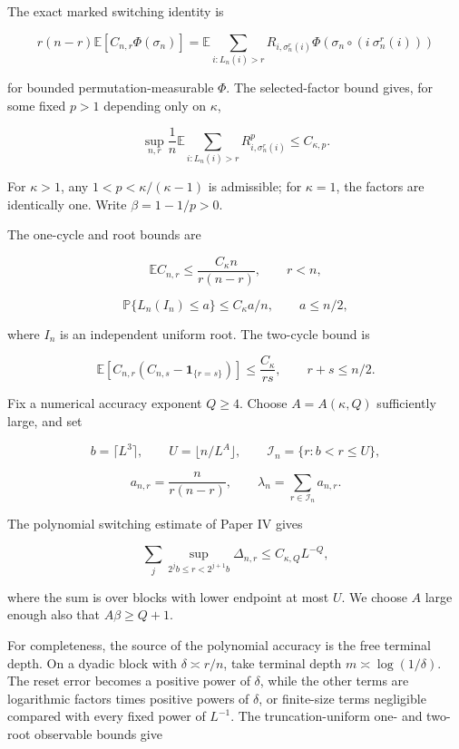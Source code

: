 \documentclass[
  11pt,
]{article}
\begin{document}
The exact marked switching identity is

\[
 r(n-r)\mathbb E[C_{n,r}\Phi(\sigma_n)]
 =\mathbb E\sum_{i:L_n(i)>r}R_{i,\sigma_n^r(i)}
 \Phi\!\left(\sigma_n\circ(i\ \sigma_n^r(i))\right)
\tag{6}
\]

for bounded permutation-measurable \(\Phi\). The selected-factor bound
gives, for some fixed \(p>1\) depending only on \(\kappa\),

\[
 \sup_{n,r}\frac1n\mathbb E\sum_{i:L_n(i)>r}
 R_{i,\sigma_n^r(i)}^p\le C_{\kappa,p}.
\tag{7}
\]

For \(\kappa>1\), any \(1<p<\kappa/(\kappa-1)\) is admissible; for
\(\kappa=1\), the factors are identically one. Write \(\beta=1-1/p>0\).

The one-cycle and root bounds are

\[
 \mathbb EC_{n,r}\le\frac{C_\kappa n}{r(n-r)},\qquad r<n,
\tag{8}
\]

\[
 \mathbb P\{L_n(I_n)\le a\}\le C_\kappa a/n,
 \qquad a\le n/2,
\tag{9}
\]

where \(I_n\) is an independent uniform root. The two-cycle bound is

\[
 \mathbb E[C_{n,r}(C_{n,s}-\mathbf1_{\{r=s\}})]
 \le\frac{C_\kappa}{rs},\qquad r+s\le n/2.
\tag{10}
\]

Fix a numerical accuracy exponent \(Q\ge4\). Choose \(A=A(\kappa,Q)\)
sufficiently large, and set

\[
 b=\lceil L^3\rceil,\qquad U=\lfloor n/L^A\rfloor,
 \qquad \mathcal I_n=\{r:b<r\le U\},
\tag{11}
\]

\[
 a_{n,r}=\frac{n}{r(n-r)},\qquad
 \lambda_n=\sum_{r\in\mathcal I_n}a_{n,r}.
\tag{12}
\]

The polynomial switching estimate of Paper IV gives

\[
 \sum_j\sup_{2^jb\le r<2^{j+1}b}\Delta_{n,r}
 \le C_{\kappa,Q}L^{-Q},
\tag{13}
\]

where the sum is over blocks with lower endpoint at most \(U\). We
choose \(A\) large enough also that \(A\beta\ge Q+1\).

For completeness, the source of the polynomial accuracy is the free
terminal depth. On a dyadic block with \(\delta\asymp r/n\), take
terminal depth \(m\asymp\log(1/\delta)\). The reset error becomes a
positive power of \(\delta\), while the other terms are logarithmic
factors times positive powers of \(\delta\), or finite-size terms
negligible compared with every fixed power of \(L^{-1}\). The
truncation-uniform one- and two-root observable bounds give
\end{document}
